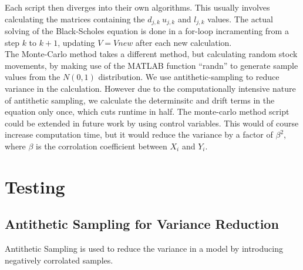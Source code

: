 \documentclass[11pt]{article}
\begin{document}
Each script then diverges into their own algorithms. This usually involves calculating the matrices containing the $d_{j,k} \ u_{j,k}$ and $l_{j,k}$ values. 
The actual solving of the Black-Scholes equation is done in a for-loop incramenting from a step $k$ to $k+1$, updating $V = Vnew$ after each new calculation. \\

The Monte-Carlo method takes a different method, but calculating random stock movements, by making use of the MATLAB function ``randn'' to generate sample 
values from the $N(0,1)$ distribution. We use antithetic-sampling to reduce variance in the calculation. However due to the computationally intensive nature of 
antithetic sampling, we calculate the determinsitc and drift terms in the equation only once, which cuts runtime in half. The monte-carlo method script could be 
extended in future work by using control variables. This would of course increase computation time, but it would reduce the variance by a factor of $\beta^2$, where 
$\beta$ is the corrolation coefficient between $X_i$ and $Y_i$.

\section{Testing}

\subsection{Antithetic Sampling for Variance Reduction}
Antithetic Sampling is used to reduce the variance in a model by introducing negatively corrolated samples. 
\end{document}
